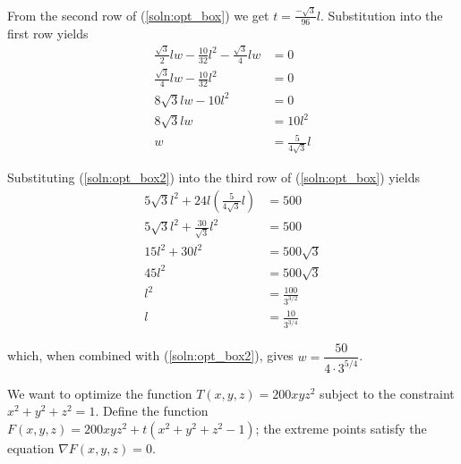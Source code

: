 From the second row of (\ref{soln:opt_box}) we get $t = \frac{-\sqrt{3}}{96}l$.
Substitution into the first row yields
\begin{align}
 \frac{\sqrt{3}}{2}lw - \frac{10}{32}l^2 - \frac{\sqrt{3}}{4}lw &= 0 \nonumber \\
 \frac{\sqrt{3}}{4}lw - \frac{10}{32}l^2 &= 0 \nonumber \\
 8\sqrt{3}lw - 10l^2 &= 0 \nonumber \\
 8\sqrt{3}lw &= 10l^2 \nonumber \\
 w &= \frac{5}{4\sqrt{3}}l \label{soln:opt_box2}
\end{align}

Substituting (\ref{soln:opt_box2}) into the third row of (\ref{soln:opt_box})
yields
\begin{align*}
 5\sqrt{3}l^2 + 24l(\frac{5}{4\sqrt{3}}l) &= 500 \\
 5\sqrt{3}l^2 + \frac{30}{\sqrt{3}}l^2 &= 500 \\
 15l^2 + 30l^2 &= 500\sqrt{3} \\
 45l^2 &= 500\sqrt{3} \\
 l^2 &= \frac{100}{3^{3/2}} \\
 l &= \frac{10}{3^{3/4}}
\end{align*}

which, when combined with (\ref{soln:opt_box2}), gives
$w = \dfrac{50}{4\cdot3^{5/4}}$.

\item

We want to optimize the function $T(x,y,z) = 200xyz^2$ subject to the
constraint $x^2+y^2+z^2 = 1$.  Define the function
$F(x,y,z) = 200xyz^2 + t(x^2+y^2+z^2-1)$; the extreme points satisfy the
equation $\nabla F(x,y,z) = 0$.

